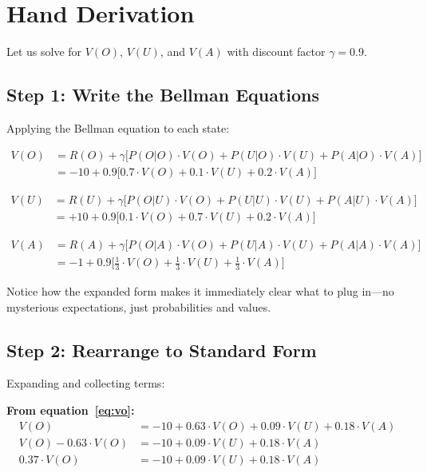 \documentclass[11pt]{article}
\theoremstyle{definition}
\begin{document}
\section{Hand Derivation}

Let us solve for $V(O)$, $V(U)$, and $V(A)$ with discount factor $\gamma = 0.9$.

\subsection{Step 1: Write the Bellman Equations}

Applying the Bellman equation to each state:

\begin{align}
V(O) &= R(O) + \gamma \Big[ P(O|O) \cdot V(O) + P(U|O) \cdot V(U) + P(A|O) \cdot V(A) \Big] \nonumber \\
&= -10 + 0.9 \Big[ 0.7 \cdot V(O) + 0.1 \cdot V(U) + 0.2 \cdot V(A) \Big] \label{eq:vo}
\end{align}

\begin{align}
V(U) &= R(U) + \gamma \Big[ P(O|U) \cdot V(O) + P(U|U) \cdot V(U) + P(A|U) \cdot V(A) \Big] \nonumber \\
&= +10 + 0.9 \Big[ 0.1 \cdot V(O) + 0.7 \cdot V(U) + 0.2 \cdot V(A) \Big] \label{eq:vu}
\end{align}

\begin{align}
V(A) &= R(A) + \gamma \Big[ P(O|A) \cdot V(O) + P(U|A) \cdot V(U) + P(A|A) \cdot V(A) \Big] \nonumber \\
&= -1 + 0.9 \Big[ \tfrac{1}{3} \cdot V(O) + \tfrac{1}{3} \cdot V(U) + \tfrac{1}{3} \cdot V(A) \Big] \label{eq:va}
\end{align}

Notice how the expanded form makes it immediately clear what to plug in---no mysterious expectations, just probabilities and values.

\subsection{Step 2: Rearrange to Standard Form}

Expanding and collecting terms:

\textbf{From equation~\eqref{eq:vo}:}
\begin{align*}
V(O) &= -10 + 0.63 \cdot V(O) + 0.09 \cdot V(U) + 0.18 \cdot V(A) \\
V(O) - 0.63 \cdot V(O) &= -10 + 0.09 \cdot V(U) + 0.18 \cdot V(A) \\
0.37 \cdot V(O) &= -10 + 0.09 \cdot V(U) + 0.18 \cdot V(A)
\end{align*}
\end{document}
